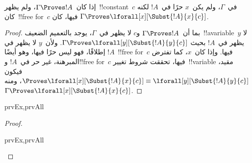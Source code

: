 \documentclass[../../../include/open-logic-section]{subfiles}
\begin{document}
\begin{thm}
إذا كان~$\Gamma \Proves !A$، ولم يظهر~!!{constant}~$c$ في~$\Gamma$،
ولم يكن~$x$ حرًا في~$!A$ لكنه كان~!!{free for}~$c$ فيها، كان
$\Gamma \Proves \lforall[x][\Subst{!A}{x}{c}]$.
\end{thm}

\begin{proof}
بما أن~$\Gamma \Proves !A$ و$c$ لا يظهر في~$\Gamma$، يوجد بالتعميم
الضعيف~!!a{variable}~$y$ لا يظهر في~$!A$ بحيث
$\Gamma \Proves \lforall[y][\Subst{!A}{y}{c}]$. ولأن~$y$ لا يظهر في
$!A$ إطلاقًا، فهو ليس حرًا فيها، وهو أيضًا~!!{free for}~$c$ فيها. وإذا
كان~$x$، كما تفترض المبرهنة، غير حر في~$!A$ و!!{free for}~$c$ فيها،
تحققت شروط تغيير~!!{variable} مقيد، فيكون
$\Proves \lforall[x][\Subst{!A}{x}{c}] \equiv
\lforall[y][\Subst{!A}{y}{c}]$، ومنه
$\Gamma \Proves \lforall[x][\Subst{!A}{x}{c}]$.
\end{proof}

\begin{thm}
\begin{tagenumerate}{prvEx,prvAll}
\end{tagenumerate}
\end{thm}

\begin{proof}
\begin{tagenumerate}{prvEx,prvAll}

\end{tagenumerate}
\end{proof}
\end{document}
